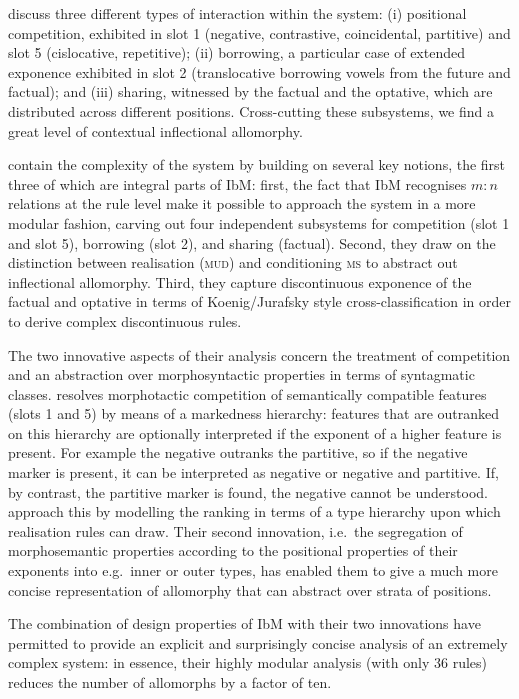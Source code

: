 \documentclass[output=paper
 	        ,biblatex
                ,babelshorthands
                ,newtxmath
                ,draftmode
                ,colorlinks, citecolor=brown
]{langscibook}
\begin{document}
\begin{exe}
\begin{xlist}
\begin{exe}
\begin{xlist}
\citet{diaz:koenig:michelson:19} discuss three different types of
interaction within the system: (i) positional competition, exhibited
in slot 1 (negative, contrastive, coincidental, partitive) and slot 5
(cislocative, repetitive); (ii) borrowing, a particular case of
extended exponence exhibited in slot 2 (translocative borrowing vowels
from the future and factual); and (iii) sharing, witnessed by the
factual and the optative, which are distributed across different
positions. Cross-cutting these subsystems, we find a great level of
contextual inflectional allomorphy.

\citet{diaz:koenig:michelson:19} contain the complexity of the system
by building on several key notions, the first three of
which are integral parts of IbM: first, the fact that IbM recognises
$m:n$ relations at the rule level make it possible to approach the
 system in a more modular fashion, carving out four independent
subsystems for competition (slot 1 and slot 5), borrowing (slot 2), and
sharing (factual). Second, they draw on the distinction between
realisation (\textsc{mud}) and conditioning \textsc{ms} to abstract
out inflectional allomorphy. Third, they capture discontinuous
exponence of the factual and optative in terms of Koenig/Jurafsky
style cross-classification in order to derive complex discontinuous
rules.

The two innovative aspects of their analysis concern the treatment of
competition and an abstraction over morphosyntactic properties in
terms of syntagmatic classes.  resolves morphotactic competition
of semantically compatible features (slots 1 and 5) by means of a
markedness hierarchy: features that are outranked on this hierarchy
are optionally interpreted if the exponent of a higher feature is
present. For example the negative outranks the partitive, so if the negative
marker is present, it can be interpreted as negative or negative and
partitive. If, by contrast, the partitive marker is found, the
negative cannot be understood.  \citet{diaz:koenig:michelson:19}
approach this by modelling the ranking in terms of a type hierarchy
upon which realisation rules can draw. Their second innovation, i.e.\ 
the  segregation of morphosemantic properties according to
the positional properties of their exponents into e.g.\ inner or outer
types, has enabled them to give a much more concise representation of
allomorphy that can abstract over strata of positions. 

The combination of design properties of IbM with their two innovations
have permitted \citet{diaz:koenig:michelson:19} to provide an explicit
and surprisingly concise analysis of an extremely complex system: in
essence, their highly modular analysis (with only 36 rules) reduces the
number of allomorphs by a factor of ten.


\end{xlist}
\end{exe}
\end{xlist}
\end{exe}
\end{document}
